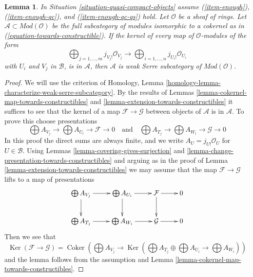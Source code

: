 \documentclass[10pt,a4paper]{amsart}
\theoremstyle{plain}
\newtheorem{lemma}[subsection]{Lemma}
\theoremstyle{definition}
\theoremstyle{remark}
\numberwithin{equation}{subsection}
\def\Ker{\mathop{\mathrm{Ker}}}
\def\Coker{\mathop{\mathrm{Coker}}}
\begin{document}
\begin{lemma}
\label{lemma-towards-constructible-when-serre-subcategory}
In Situation \ref{situation-quasi-compact-objects} assume
(\ref{item-enough}), (\ref{item-enough-qc}), and (\ref{item-enough-qc-qs})
hold. Let $\mathcal{O}$ be a sheaf of rings.
Let $\mathcal{A} \subset \textit{Mod}(\mathcal{O})$ be the full
subcategory of modules isomorphic to a cokernel as in
(\ref{equation-towards-constructible}).
If the kernel of every map of $\mathcal{O}$-modules of the form
$$
\bigoplus\nolimits_{j = 1, \ldots, m} j_{V_j!}\mathcal{O}_{V_j}
\longrightarrow
\bigoplus\nolimits_{i = 1, \ldots, n} j_{U_i!}\mathcal{O}_{U_i}
$$
with $U_i$ and $V_j$ in $\mathcal{B}$, is in $\mathcal{A}$, then
$\mathcal{A}$ is weak Serre subcategory of $\textit{Mod}(\mathcal{O})$.
\end{lemma}

\begin{proof}
We will use the criterion of
Homology, Lemma \ref{homology-lemma-characterize-weak-serre-subcategory}.
By the results of
Lemmas \ref{lemma-cokernel-map-towards-constructibles} and
\ref{lemma-extension-towards-constructibles}
it suffices to see that the kernel of a map $\mathcal{F} \to \mathcal{G}$
between objects of $\mathcal{A}$ is in $\mathcal{A}$. To prove this
choose presentations
$$
\bigoplus A_{V_j} \to \bigoplus A_{U_i} \to \mathcal{F} \to 0
\quad\text{and}\quad
\bigoplus A_{T_j} \to \bigoplus A_{W_i} \to \mathcal{G} \to 0
$$
In this proof the direct sums are always finite, and
we write $A_U = j_{U!}\mathcal{O}_U$ for $U \in \mathcal{B}$.
Using Lemmas \ref{lemma-covering-gives-surjection} and
\ref{lemma-change-presentation-towards-constructibles}
and arguing as in the proof of
Lemma \ref{lemma-extension-towards-constructibles}
we may assume that the map $\mathcal{F} \to \mathcal{G}$
lifts to a map of presentations
$$
\xymatrix{
\bigoplus A_{V_j} \ar[r] \ar[d] &
\bigoplus A_{U_i} \ar[r] \ar[d] &
\mathcal{F} \ar[r] \ar[d] & 0 \\
\bigoplus A_{T_j} \ar[r] &
\bigoplus A_{W_i} \ar[r] &
\mathcal{G} \ar[r] & 0
}
$$
Then we see that
$$
\Ker(\mathcal{F} \to \mathcal{G}) =
\Coker\left(\bigoplus A_{V_j} \to
\Ker\left(
\bigoplus A_{T_j} \oplus \bigoplus A_{U_i} \to \bigoplus A_{W_i}\right)\right)
$$
and the lemma follows from the assumption and
Lemma \ref{lemma-cokernel-map-towards-constructibles}.
\end{proof}
\end{document}
